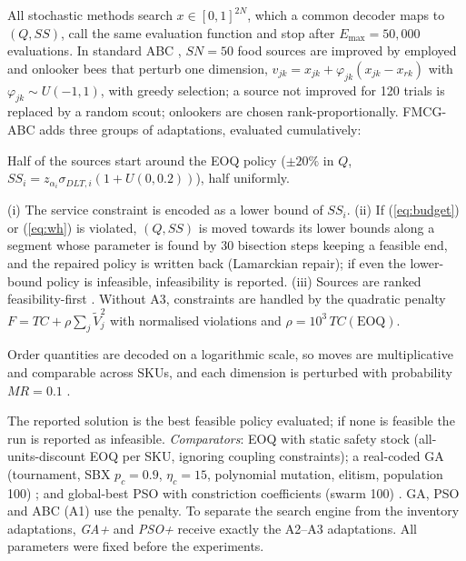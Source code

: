 \documentclass[preprint,12pt,authoryear]{elsarticle}
\newcommand{\sdlt}{\sigma_{DLT,i}}
\begin{document}
All stochastic methods search $x\in[0,1]^{2N}$, which a common decoder maps to $(Q,SS)$, call the same evaluation function and stop after $E_{\max}=50{,}000$ evaluations. In standard ABC \citep{Karaboga2007}, $SN=50$ food sources are improved by employed and onlooker bees that perturb one dimension, $v_{jk}=x_{jk}+\varphi_{jk}(x_{jk}-x_{rk})$ with $\varphi_{jk}\sim U(-1,1)$, with greedy selection; a source not improved for 120 trials is replaced by a random scout; onlookers are chosen rank-proportionally. FMCG-ABC adds three groups of adaptations, evaluated cumulatively:
\begin{description}[leftmargin=0pt]
\item[A2 EOQ-informed initialisation.] Half of the sources start around the EOQ policy ($\pm20\%$ in $Q$, $SS_i=z_{\alpha_i}\sdlt(1+U(0,0.2))$), half uniformly.
\item[A3 Constraint adaptation.] (i) The service constraint is encoded as a lower bound of $SS_i$. (ii) If (\ref{eq:budget}) or (\ref{eq:wh}) is violated, $(Q,SS)$ is moved towards its lower bounds along a segment whose parameter is found by 30 bisection steps keeping a feasible end, and the repaired policy is written back (Lamarckian repair); if even the lower-bound policy is infeasible, infeasibility is reported. (iii) Sources are ranked feasibility-first \citep{Deb2000}. Without A3, constraints are handled by the quadratic penalty $F=TC+\rho\sum_j\tilde V_j^2$ with normalised violations and $\rho=10^3\,TC(\text{EOQ})$.
\item[A4 Inventory-specific move (full FMCG-ABC).] Order quantities are decoded on a logarithmic scale, so moves are multiplicative and comparable across SKUs, and each dimension is perturbed with probability $MR=0.1$ \citep{Akay2012}.
\end{description}
The reported solution is the best feasible policy evaluated; if none is feasible the run is reported as infeasible. \emph{Comparators}: EOQ with static safety stock (all-units-discount EOQ per SKU, ignoring coupling constraints); a real-coded GA (tournament, SBX $p_c=0.9$, $\eta_c=15$, polynomial mutation, elitism, population 100) \citep{DebAgrawal1995}; and global-best PSO with constriction coefficients (swarm 100) \citep{ClercKennedy2002}. GA, PSO and ABC (A1) use the penalty. To separate the search engine from the inventory adaptations, \emph{GA+} and \emph{PSO+} receive exactly the A2--A3 adaptations. All parameters were fixed before the experiments.

\end{document}
